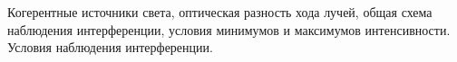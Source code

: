 \documentclass[__main__.tex]{subfiles}
\begin{document}
Когерентные источники света, оптическая разность хода лучей, общая схема наблюдения интерференции, условия минимумов и максимумов интенсивности. Условия наблюдения интерференции.\\ 

\end{document}
